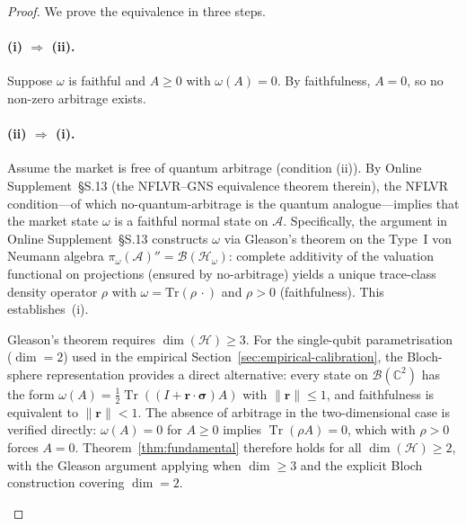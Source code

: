 \begin{proof}
We prove the equivalence in three steps.

\paragraph{(i) $\Rightarrow$ (ii).}
Suppose $\omega$ is faithful and $A \geq 0$ with $\omega(A) = 0$. By faithfulness,
$A = 0$, so no non-zero arbitrage exists.

\paragraph{(ii) $\Rightarrow$ (i).}
Assume the market is free of quantum arbitrage (condition (ii)).
By Online Supplement~\S{S.13} (the NFLVR--GNS equivalence theorem therein), the NFLVR
condition---of which no-quantum-arbitrage is the quantum analogue---implies
that the market state $\omega$ is a faithful normal state on $\mathcal{A}$.
Specifically, the argument in Online Supplement~\S{S.13} constructs $\omega$
via Gleason's theorem on the Type~I von Neumann algebra $\pi_\omega(\mathcal{A})''
= \mathcal{B}(\mathcal{H}_\omega)$: complete additivity of the valuation
functional on projections (ensured by no-arbitrage) yields a unique
trace-class density operator $\rho$ with $\omega = \mathrm{Tr}(\rho\,\cdot)$
and $\rho > 0$ (faithfulness). This establishes~(i).

\begin{remark}
\label{rem:gleason-dim}
Gleason's theorem \citep{gleason1957measures} requires $\dim(\mathcal{H}) \geq 3$.
For the single-qubit parametrisation ($\dim = 2$) used in the empirical
Section~\ref{sec:empirical-calibration}, the Bloch-sphere representation
provides a direct alternative: every state on $\mathcal{B}(\mathbb{C}^2)$
has the form $\omega(A) = \tfrac{1}{2}\operatorname{Tr}((I + \mathbf{r}\cdot\boldsymbol{\sigma})A)$
with $\|\mathbf{r}\|\leq 1$, and faithfulness is equivalent to $\|\mathbf{r}\|<1$.
The absence of arbitrage in the two-dimensional case is verified directly:
$\omega(A) = 0$ for $A \geq 0$ implies $\operatorname{Tr}(\rho A) = 0$, which
with $\rho > 0$ forces $A = 0$. Theorem~\ref{thm:fundamental} therefore holds
for all $\dim(\mathcal{H}) \geq 2$, with the Gleason argument applying when
$\dim \geq 3$ and the explicit Bloch construction covering $\dim = 2$.
\end{remark}


\end{proof}
